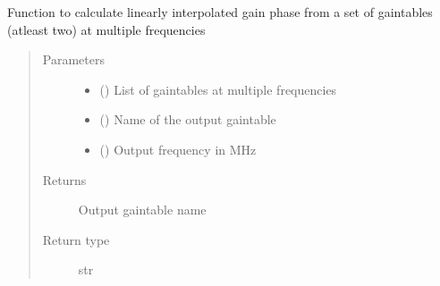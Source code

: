 \documentclass[letterpaper,10pt,english]{sphinxmanual}
\begin{document}

\begin{fulllineitems}
\label{\detokenize{paircars:paircars.basic_func.multifreq_gaincal_interpolate}}
\sphinxAtStartPar
Function to calculate linearly interpolated gain phase from a set of gaintables (at\sphinxhyphen{}least two) at multiple frequencies
\begin{quote}\begin{description}
\item[{Parameters}] \leavevmode\begin{itemize}
\item {} 
\sphinxAtStartPar
{} () \textendash{} List of gaintables at multiple frequencies

\item {} 
\sphinxAtStartPar
{} () \textendash{} Name of the output gaintable

\item {} 
\sphinxAtStartPar
{} () \textendash{} Output frequency in MHz

\end{itemize}

\item[{Returns}] \leavevmode
\sphinxAtStartPar
Output gaintable name

\item[{Return type}] \leavevmode
\sphinxAtStartPar
str

\end{description}\end{quote}

\end{fulllineitems}

\end{document}
